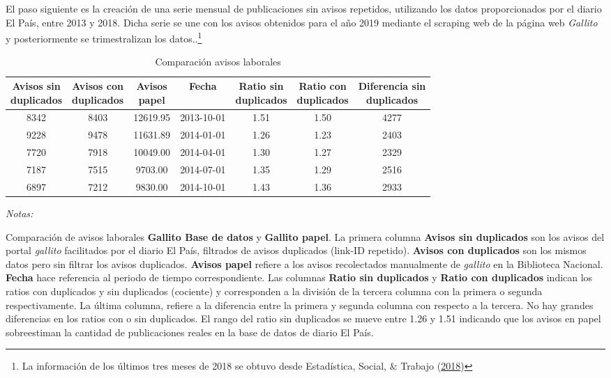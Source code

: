 \documentclass[12pt,oneside]{reedthesis}
\begin{document}
El paso siguiente es la creación de una serie mensual de publicaciones sin avisos repetidos, utilizando los datos proporcionados por el diario El País, entre 2013 y 2018. Dicha serie se une con los avisos obtenidos para el año 2019 mediante el scraping web de la página web \emph{Gallito} y posteriormente se trimestralizan los datos..\footnote{La información de los últimos tres meses de 2018 se obtuvo desde Estadística, Social, \& Trabajo (\protect\hyperlink{ref-MTSS2018}{2018})}
\begin{table}[!h]

\caption{\label{tab:comparacion-gallito}Comparación avisos laborales}
\centering
\fontsize{10}{12}\selectfont
\begin{threeparttable}
\begin{tabular}[t]{ccccccc}
\toprule
\makecell[l]{Avisos sin\\ duplicados} & \makecell[l]{Avisos con\\ duplicados} & \makecell[l]{Avisos\\ papel} & Fecha & \makecell[l]{Ratio sin\\ duplicados} & \makecell[l]{Ratio con\\ duplicados} & \makecell[l]{Diferencia sin\\ duplicados}\\
\midrule
8342 & 8403 & 12619.95 & 2013-10-01 & 1.51 & 1.50 & 4277\\
9228 & 9478 & 11631.89 & 2014-01-01 & 1.26 & 1.23 & 2403\\
7720 & 7918 & 10049.00 & 2014-04-01 & 1.30 & 1.27 & 2329\\
7187 & 7515 & 9703.00 & 2014-07-01 & 1.35 & 1.29 & 2516\\
6897 & 7212 & 9830.00 & 2014-10-01 & 1.43 & 1.36 & 2933\\
\bottomrule
\end{tabular}
\begin{tablenotes}
\item \textit{Notas:} 
\item \footnotesize Comparación de avisos laborales \textbf{Gallito Base de datos} y \textbf{Gallito papel}. La primera columna \textbf{Avisos sin duplicados} son los avisos del portal \textit{gallito} facilitados por el diario El País, filtrados de avisos duplicados (link-ID repetido). \textbf{Avisos con duplicados} son los mismos datos pero sin filtrar los avisos duplicados. \textbf{Avisos papel} refiere a los avisos recolectados manualmente de \textit{gallito} en la Biblioteca Nacional. \textbf{Fecha} hace referencia al periodo de tiempo correspondiente. Las columnas \textbf{Ratio sin duplicados} y \textbf{Ratio con duplicados} indican los ratios con duplicados y sin duplicados (cociente) y corresponden a la división de la tercera columna con la primera o segunda respectivamente. La última columna, refiere a la diferencia entre la primera y segunda columna con respecto a la tercera. No hay grandes diferencias en los ratios con o sin duplicados. El rango del ratio sin duplicados se mueve entre 1.26 y 1.51 indicando que los avisos en papel sobreestiman la cantidad de publicaciones reales en la base de datos de diario El País.


\end{tablenotes}
\end{threeparttable}
\end{table}
\end{document}
